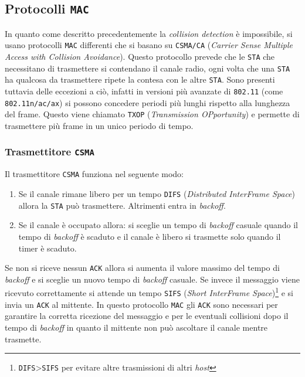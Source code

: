     \subsection{Protocolli \texttt{MAC}}
        In quanto come descritto precedentemente la \textit{collision detection} è impossibile, si usano protocolli \texttt{MAC} differenti che si basano su \texttt{CSMA/CA} (\textit{Carrier Sense Multiple Access with Collision Avoidance}). Questo protocollo prevede che le \texttt{STA} che necessitano di trasmettere si contendano il canale radio, ogni volta che una \texttt{STA} ha qualcosa da trasmettere ripete la contesa con le altre \texttt{STA}. Sono presenti tuttavia delle eccezioni a ciò, infatti in versioni più avanzate di \texttt{802.11} (come \texttt{802.11n/ac/ax}) si possono concedere periodi più lunghi rispetto alla lunghezza del frame. Questo viene chiamato \texttt{TXOP} (\textit{Transmission OPportunity}) e permette di trasmettere più frame in un unico periodo di tempo.
        \subsubsection{Trasmettitore \texttt{CSMA}}
            Il trasmettitore \texttt{CSMA} funziona nel seguente modo:
            \begin{enumerate}
                \item Se il canale rimane libero per un tempo \texttt{DIFS} (\textit{Distributed InterFrame Space}) allora la \texttt{STA} può trasmettere. Altrimenti entra in \textit{backoff}.
                \item Se il canale è occupato allora:
                    \subitem si sceglie un tempo di \textit{backoff} casuale
                    \subitem quando il tempo di \textit{backoff} è scaduto e il canale è libero si trasmette solo quando il timer è scaduto.
            \end{enumerate}
            Se non si riceve nessun \texttt{ACK} allora si aumenta il valore massimo del tempo di \textit{backoff} e si sceglie un nuovo tempo di \textit{backoff} casuale.\newline
            Se invece il messaggio viene ricevuto correttamente si attende un tempo \texttt{SIFS} (\textit{Short InterFrame Space})\footnote{\texttt{DIFS}>\texttt{SIFS} per evitare altre trasmissioni di altri \textit{host}} e si invia un \texttt{ACK} al mittente. In questo protocollo \texttt{MAC} gli \texttt{ACK} sono necessari per garantire la corretta ricezione del messaggio e per le eventuali collisioni dopo il tempo di \textit{backoff} in quanto il mittente non può ascoltare il canale mentre trasmette.
